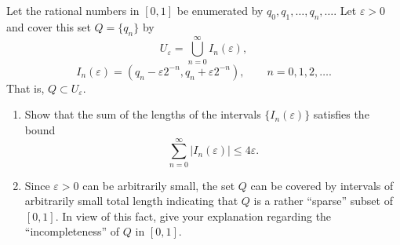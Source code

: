 \begingroup
\renewcommand{\labelenumi}{(\alph{enumi})}
\begin{exercise}
  \label{ex:hw03:rational-interval-cover}
  Let the rational numbers in $[0,1]$ be enumerated by
  $q_0,q_1,\ldots,q_n,\ldots$. Let $\varepsilon>0$ and cover this set
  $Q=\{q_n\}$ by
  \[
    U_\varepsilon=\bigcup_{n=0}^{\infty}I_n(\varepsilon),
  \]
  \[
    I_n(\varepsilon)=(q_n-\varepsilon 2^{-n},q_n+\varepsilon 2^{-n}),
    \qquad n=0,1,2,\ldots.
  \]
  That is, $Q\subset U_\varepsilon$.
  \begin{enumerate}
    \item Show that the sum of the lengths of the intervals
      $\{I_n(\varepsilon)\}$ satisfies the bound
      \[
        \sum_{n=0}^{\infty}|I_n(\varepsilon)|\leq4\varepsilon.
      \]
    \item Since $\varepsilon>0$ can be arbitrarily small, the set $Q$ can
      be covered by intervals of arbitrarily small total length indicating
      that $Q$ is a rather ``sparse'' subset of $[0,1]$. In view of this
      fact, give your explanation regarding the ``incompleteness'' of $Q$
      in $[0,1]$.
  \end{enumerate}
\end{exercise}
\endgroup

